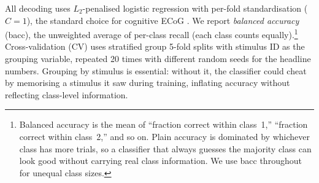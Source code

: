 \documentclass[11pt]{article}
\begin{document}
All decoding uses $L_2$-penalised logistic regression with per-fold standardisation ($C = 1$), the standard choice for cognitive ECoG \citep{Holdgraf2017}. We report \emph{balanced accuracy} (bacc), the unweighted average of per-class recall (each class counts equally).\footnote{Balanced accuracy is the mean of ``fraction correct within class~1,'' ``fraction correct within class~2,'' and so on. Plain accuracy is dominated by whichever class has more trials, so a classifier that always guesses the majority class can look good without carrying real class information. We use bacc throughout for unequal class sizes.} Cross-validation (CV) uses stratified group 5-fold splits with stimulus ID as the grouping variable, repeated 20 times with different random seeds for the headline numbers. Grouping by stimulus is essential: without it, the classifier could cheat by memorising a stimulus it saw during training, inflating accuracy without reflecting class-level information.
\end{document}
